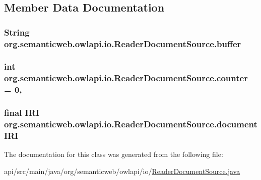 \subsection{Member Data Documentation}
\hypertarget{classorg_1_1semanticweb_1_1owlapi_1_1io_1_1_reader_document_source_ad5f184ffb876a9e6f20606d70ece13af}{
\subsubsection[{buffer}]{\setlength{\rightskip}{0pt plus 5cm}String org.\-semanticweb.\-owlapi.\-io.\-Reader\-Document\-Source.\-buffer\hspace{0.3cm}{\ttfamily [private]}}}\label{classorg_1_1semanticweb_1_1owlapi_1_1io_1_1_reader_document_source_ad5f184ffb876a9e6f20606d70ece13af}
\hypertarget{classorg_1_1semanticweb_1_1owlapi_1_1io_1_1_reader_document_source_a915906c985f84e86dfb165bd6cdd5070}{
\subsubsection[{counter}]{\setlength{\rightskip}{0pt plus 5cm}int org.\-semanticweb.\-owlapi.\-io.\-Reader\-Document\-Source.\-counter = 0\hspace{0.3cm}{\ttfamily [static]}, {\ttfamily [private]}}}\label{classorg_1_1semanticweb_1_1owlapi_1_1io_1_1_reader_document_source_a915906c985f84e86dfb165bd6cdd5070}
\hypertarget{classorg_1_1semanticweb_1_1owlapi_1_1io_1_1_reader_document_source_ace78abe4870c84ff075477da9c242475}{
\subsubsection[{document\-I\-R\-I}]{\setlength{\rightskip}{0pt plus 5cm}final {\bf I\-R\-I} org.\-semanticweb.\-owlapi.\-io.\-Reader\-Document\-Source.\-document\-I\-R\-I\hspace{0.3cm}{\ttfamily [private]}}}\label{classorg_1_1semanticweb_1_1owlapi_1_1io_1_1_reader_document_source_ace78abe4870c84ff075477da9c242475}


The documentation for this class was generated from the following file\-:\begin{DoxyCompactItemize}
\item 
api/src/main/java/org/semanticweb/owlapi/io/\hyperlink{_reader_document_source_8java}{Reader\-Document\-Source.\-java}\end{DoxyCompactItemize}
